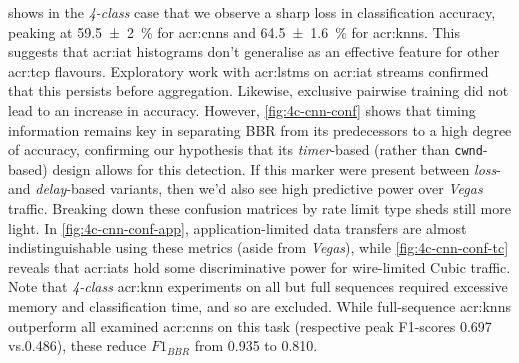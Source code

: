  shows in the \emph{4-class} case that we observe a sharp loss in classification accuracy, peaking at \qty{59.5 +- 2}{\percent} for \glspl{acr:cnn} and \SI{64.5 +- 1.6}{\percent} for \glspl{acr:knn}.
This suggests that \gls{acr:iat} histograms don't generalise as an effective feature for other \gls{acr:tcp} flavours.
Exploratory work with \glspl{acr:lstm} on \gls{acr:iat} streams confirmed that this persists before aggregation.
Likewise, exclusive pairwise training did not lead to an increase in accuracy.
However, \cref{fig:4c-cnn-conf} shows that timing information remains key in separating BBR from its predecessors to a high degree of accuracy, confirming our hypothesis that its \emph{timer}-based (rather than \texttt{cwnd}-based) design allows for this detection.
If this marker were present between \emph{loss}- and \emph{delay}-based variants, then we'd also see high predictive power over \emph{Vegas} traffic.
Breaking down these confusion matrices by rate limit type sheds still more light.
In \cref{fig:4c-cnn-conf-app}, application-limited data transfers are almost indistinguishable using these metrics (aside from \emph{Vegas}), while \cref{fig:4c-cnn-conf-tc} reveals that \glspl{acr:iat} hold some discriminative power for wire-limited Cubic traffic.
Note that \emph{4-class} \gls{acr:knn} experiments on all but full sequences required excessive memory and classification time, and so are excluded.
While full-sequence \glspl{acr:knn} outperform all examined \glspl{acr:cnn} on this task (respective peak F1-scores \num{0.697} vs.\@ \num{0.486}), these reduce $\mathit{F1}_\mathit{BBR}$ from \num{0.935} to \num{0.810}.

